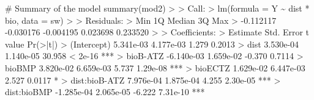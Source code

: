 \documentclass[
  letterpaper,
]{book}
\newenvironment{Shaded}{\begin{snugshade}}{\end{snugshade}}
\newcommand{\AttributeTok}[1]{\textcolor[rgb]{0.40,0.45,0.13}{#1}}
\newcommand{\CommentTok}[1]{\textcolor[rgb]{0.37,0.37,0.37}{#1}}
\newcommand{\DecValTok}[1]{\textcolor[rgb]{0.68,0.00,0.00}{#1}}
\newcommand{\ErrorTok}[1]{\textcolor[rgb]{0.68,0.00,0.00}{#1}}
\newcommand{\FloatTok}[1]{\textcolor[rgb]{0.68,0.00,0.00}{#1}}
\newcommand{\FunctionTok}[1]{\textcolor[rgb]{0.28,0.35,0.67}{#1}}
\newcommand{\NormalTok}[1]{\textcolor[rgb]{0.00,0.23,0.31}{#1}}
\newcommand{\SpecialCharTok}[1]{\textcolor[rgb]{0.37,0.37,0.37}{#1}}
\begin{document}
\begin{Shaded}
\begin{Highlighting}[]
\CommentTok{\# Summary of the model}
\FunctionTok{summary}\NormalTok{(mod2)}
\SpecialCharTok{\textgreater{}} 
\ErrorTok{\textgreater{}}\NormalTok{ Call}\SpecialCharTok{:}
\ErrorTok{\textgreater{}} \FunctionTok{lm}\NormalTok{(}\AttributeTok{formula =}\NormalTok{ Y }\SpecialCharTok{\textasciitilde{}}\NormalTok{ dist }\SpecialCharTok{*}\NormalTok{ bio, }\AttributeTok{data =}\NormalTok{ sw)}
\SpecialCharTok{\textgreater{}} 
\ErrorTok{\textgreater{}}\NormalTok{ Residuals}\SpecialCharTok{:}
\ErrorTok{\textgreater{}}\NormalTok{       Min        }\DecValTok{1}\NormalTok{Q    Median        }\DecValTok{3}\NormalTok{Q       Max }
\SpecialCharTok{\textgreater{}} \SpecialCharTok{{-}}\FloatTok{0.112117} \SpecialCharTok{{-}}\FloatTok{0.030176} \SpecialCharTok{{-}}\FloatTok{0.004195}  \FloatTok{0.023698}  \FloatTok{0.233520} 
\SpecialCharTok{\textgreater{}} 
\ErrorTok{\textgreater{}}\NormalTok{ Coefficients}\SpecialCharTok{:}
\ErrorTok{\textgreater{}}\NormalTok{                 Estimate Std. Error t value }\FunctionTok{Pr}\NormalTok{(}\SpecialCharTok{\textgreater{}}\ErrorTok{|}\NormalTok{t}\SpecialCharTok{|}\NormalTok{)    }
\SpecialCharTok{\textgreater{}}\NormalTok{ (Intercept)    }\FloatTok{5.341e{-}03}  \FloatTok{4.177e{-}03}   \FloatTok{1.279}   \FloatTok{0.2013}    
\SpecialCharTok{\textgreater{}}\NormalTok{ dist           }\FloatTok{3.530e{-}04}  \FloatTok{1.140e{-}05}  \FloatTok{30.958}  \SpecialCharTok{\textless{}} \FloatTok{2e{-}16} \SpecialCharTok{**}\ErrorTok{*}
\ErrorTok{\textgreater{}}\NormalTok{ bioB}\SpecialCharTok{{-}}\NormalTok{ATZ      }\SpecialCharTok{{-}}\FloatTok{6.140e{-}03}  \FloatTok{1.659e{-}02}  \SpecialCharTok{{-}}\FloatTok{0.370}   \FloatTok{0.7114}    
\SpecialCharTok{\textgreater{}}\NormalTok{ bioBMP         }\FloatTok{3.820e{-}02}  \FloatTok{6.659e{-}03}   \FloatTok{5.737} \FloatTok{1.29e{-}08} \SpecialCharTok{**}\ErrorTok{*}
\ErrorTok{\textgreater{}}\NormalTok{ bioECTZ        }\FloatTok{1.629e{-}02}  \FloatTok{6.447e{-}03}   \FloatTok{2.527}   \FloatTok{0.0117} \SpecialCharTok{*}  
\ErrorTok{\textgreater{}}\NormalTok{ dist}\SpecialCharTok{:}\NormalTok{bioB}\SpecialCharTok{{-}}\NormalTok{ATZ  }\FloatTok{7.976e{-}04}  \FloatTok{1.875e{-}04}   \FloatTok{4.255} \FloatTok{2.30e{-}05} \SpecialCharTok{**}\ErrorTok{*}
\ErrorTok{\textgreater{}}\NormalTok{ dist}\SpecialCharTok{:}\NormalTok{bioBMP   }\SpecialCharTok{{-}}\FloatTok{1.285e{-}04}  \FloatTok{2.065e{-}05}  \SpecialCharTok{{-}}\FloatTok{6.222} \FloatTok{7.31e{-}10} \SpecialCharTok{**}\ErrorTok{*}

\end{Highlighting}
\end{Shaded}
\end{document}
